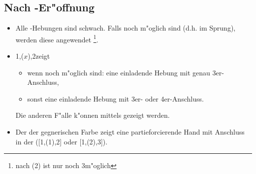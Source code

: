 \subsection{Nach \of-Er"offnung}
\begin{itemize}
\item Alle \ofa-Hebungen sind schwach.  Falls 
  noch m"oglich sind (d.h. im Sprung), werden diese angewendet%
  \footnote{nach (2\tre) ist nur noch 3\kar m"oglich}.
\item 1\of{}\sep($x$){}\sep2\SA zeigt
  \begin{itemize}
  \item wenn  noch m"oglich sind: eine einladende
    Hebung mit genau 3er-Anschluss,
  \item sonst eine einladende Hebung mit 3er- oder 4er-Anschluss.
  \end{itemize}
Die anderen F"alle k"onnen mittels  gezeigt werden.
\item Der  der gegnerischen Farbe zeigt eine
  partieforcierende Hand mit Anschluss in der \ofa
  ([1\of{}\sep(1\anybid){}\sep2\anybid{}] oder
[1\of{}\sep(2\anybid){}\sep3\anybid{}]).
\end{itemize}


